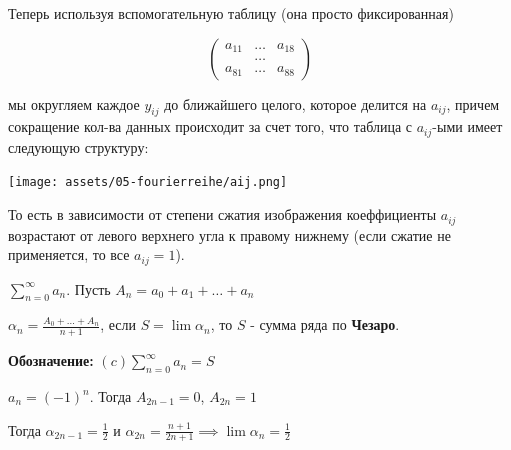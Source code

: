 \begin{remark}
    Теперь используя вспомогательную таблицу (она просто фиксированная)

    $$\begin{pmatrix}
    a_{11} & \ldots & a_{18} \\
    & \ldots \\
    a_{81} & \ldots & a_{88}
    \end{pmatrix}$$

    мы округляем каждое $y_{ij}$ до ближайшего целого, которое делится на $a_{ij}$, причем сокращение кол-ва данных происходит за счет того, что таблица с $a_{ij}$-ыми имеет следующую структуру:

    \begin{center}
        \texttt{[image: assets/05-fourierreihe/aij.png]}
    \end{center}

    То есть в зависимости от степени сжатия изображения коеффициенты $a_{ij}$ возрастают от левого верхнего угла к правому нижнему (если сжатие не применяется, то все $a_{ij} = 1$).
\end{remark}


\begin{definition}
    $\sum\limits_{n = 0}^\infty a_n$. Пусть $A_n = a_0 + a_1 + \ldots + a_n$

    $\alpha_n = \frac{A_0 + \ldots + A_n}{n+1}$, если $S = \lim \alpha_n$, то $S$ - сумма ряда по \textbf{Чезаро}.

    \textbf{Обозначение: } $(c) \sum\limits_{n = 0}^\infty a_n = S$
\end{definition}

\begin{example}
    $a_n = (-1)^n$. Тогда $A_{2n-1} = 0$, $A_{2n} = 1$

    Тогда $\alpha_{2n - 1} = \frac{1}{2}$ и $\alpha_{2n} = \frac{n + 1}{2n + 1} \implies \lim \alpha_n = \frac{1}{2}$
\end{example}

